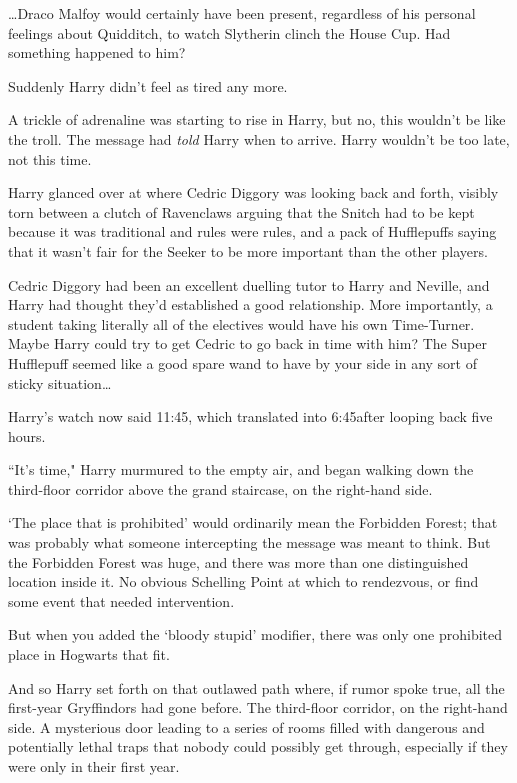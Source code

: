 {\ldots}Draco Malfoy would certainly have been present, regardless of his personal feelings about Quidditch, to watch Slytherin clinch the House Cup. Had something happened to him?

Suddenly Harry didn't feel as tired any more.

A trickle of adrenaline was starting to rise in Harry, but no, this wouldn't be like the troll. The message had \emph{told} Harry when to arrive. Harry wouldn't be too late, not this time.

Harry glanced over at where Cedric Diggory was looking back and forth, visibly torn between a clutch of Ravenclaws arguing that the Snitch had to be kept because it was traditional and rules were rules, and a pack of Hufflepuffs saying that it wasn't fair for the Seeker to be more important than the other players.

Cedric Diggory had been an excellent duelling tutor to Harry and Neville, and Harry had thought they'd established a good relationship. More importantly, a student taking literally all of the electives would have his own Time-Turner. Maybe Harry could try to get Cedric to go back in time with him? The Super Hufflepuff seemed like a good spare wand to have by your side in any sort of sticky situation{\ldots}


Harry's watch now said 11:45, which translated into 6:45\pm after looping back five hours.

``It's time," Harry murmured to the empty air, and began walking down the third-floor corridor above the grand staircase, on the right-hand side.

`The place that is prohibited' would ordinarily mean the Forbidden Forest; that was probably what someone intercepting the message was meant to think. But the Forbidden Forest was huge, and there was more than one distinguished location inside it. No obvious Schelling Point at which to rendezvous, or find some event that needed intervention.

But when you added the `bloody stupid' modifier, there was only one prohibited place in Hogwarts that fit.

And so Harry set forth on that outlawed path where, if rumor spoke true, all the first-year Gryffindors had gone before. The third-floor corridor, on the right-hand side. A mysterious door leading to a series of rooms filled with dangerous and potentially lethal traps that nobody could possibly get through, especially if they were only in their first year.

